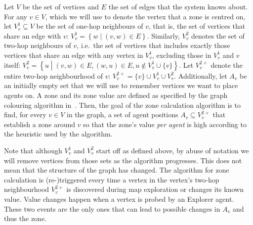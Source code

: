 \begin{definition}
  Let $V$ be the set of vertices and $E$ the set of edges that the system knows about.
  For any $v \in V$, which we will use to denote the vertex that a zone is centred on, let $V_v^1 \subseteq V$ be the set of one-hop neighbours of $v$, that is, the set of vertices that share an edge with $v$: $V_v^1= \left\{w \middle|\left(v,w \right ) \in E\right\}$.
  Similarly, $V_v^2$ denotes the set of two-hop neighbours of $v$, i.e.\ the set of vertices that includes exactly those vertices that share an edge with any vertex in $V_v^1$, excluding those in $V_v^1$ and $v$ itself: $V_v^2= \left\{u \middle|\left(v,w \right ) \in E, \left(w,u \right ) \in E, u \notin V_v^1\cup\{v\}\right\}$.
  Let $V_v^{2+}$ denote the entire two-hop neighbourhood of $v$: $V_{v}^{2+} = \{v\} \cup V_v^1 \cup V_v^2$.
  Additionally, let $A_v$ be an initially empty set that we will use to remember vertices we want to place agents on.
  A zone and its zone value are defined as specified by the graph colouring algorithm in~\cite{ahlbrecht_mapc_2014}.
  Then, the goal of the zone calculation algorithm is to find, for every $v \in V$ in the graph, a set of agent positions $A_v \subseteq V_{v}^{2+}$ that establish a zone around $v$ so that the zone's value \emph{per agent} is high according to the heuristic used by the algorithm.
\end{definition}
Note that although $V_v^1$ and $V_v^2$ start off as defined above, by abuse of notation we will remove vertices from those sets as the algorithm progresses.
This does not mean that the structure of the graph has changed.
The algorithm for zone calculation is (re-)triggered every time a vertex in the vertex's two-hop neighbourhood $V_{v}^{2+}$ is discovered during map exploration or changes its known value.
Value changes happen when a vertex is probed by an Explorer agent.
These two events are the only ones that can lead to possible changes in $A_v$ and thus the zone.

